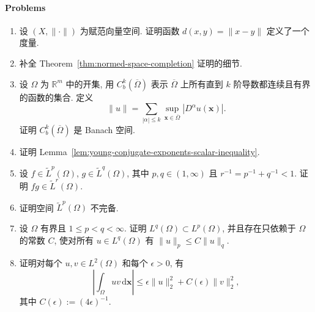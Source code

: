 \paragraph*{Problems}

\begin{enumerate}[label=\thesection.\arabic*.,ref=\thesection.\arabic*,start=1,series=book-problems]

\item\label{ex:norm-induced-metric} 设 $(X,\|\cdot\|)$ 为赋范向量空间. 证明函数 $d(x,y)=\|x-y\|$ 定义了一个度量.

\item\label{ex:completion-theorem-proof-details} 补全 Theorem~\ref{thm:normed-space-completion} 证明的细节.

\item\label{ex:bounded-continuous-derivatives-banach} 设 $\Omega$ 为 $\mathbb{R}^m$ 中的开集, 用 $C_b^k(\overline\Omega)$ 表示 $\overline\Omega$ 上所有直到 $k$ 阶导数都连续且有界的函数的集合. 定义
\begin{equation}\label{eq:bounded-continuous-derivatives-sum-norm}
\|u\|=\sum_{|\alpha|\leq k}\sup_{\bm{x}\in\overline\Omega}|D^\alpha u(\bm{x})|.
\end{equation}
证明 $C_b^k(\overline\Omega)$ 是 Banach 空间.

\item\label{ex:young-conjugate-exponents-inequality} 证明 Lemma~\ref{lem:young-conjugate-exponents-scalar-inequality}.

\item\label{ex:lp-product-conjugate-exponent-variant} 设 $f\in\widetilde L^p(\Omega)$, $g\in\widetilde L^q(\Omega)$, 其中 $p,q\in(1,\infty)$ 且 $r^{-1}=p^{-1}+q^{-1}<1$. 证明 $fg\in\widetilde L^r(\Omega)$.

\item\label{ex:continuous-lp-not-complete} 证明空间 $\widetilde L^p(\Omega)$ 不完备.

\item\label{ex:bounded-domain-lq-lp-inclusion} 设 $\Omega$ 有界且 $1\leq p<q<\infty$. 证明 $L^q(\Omega)\subset L^p(\Omega)$, 并且存在只依赖于 $\Omega$ 的常数 $C$, 使对所有 $u\in L^q(\Omega)$ 有 $\|u\|_p\leq C\|u\|_q$.

\item\label{ex:lp-two-product-epsilon-bound} 证明对每个 $u,v\in L^2(\Omega)$ 和每个 $\epsilon>0$, 有 \[\left|\int_\Omega uv\,\mathrm{d}\bm{x}\right|\leq\epsilon\|u\|_2^2+C(\epsilon)\|v\|_2^2,\] 其中 $C(\epsilon):=(4\epsilon)^{-1}$.


\end{enumerate}
